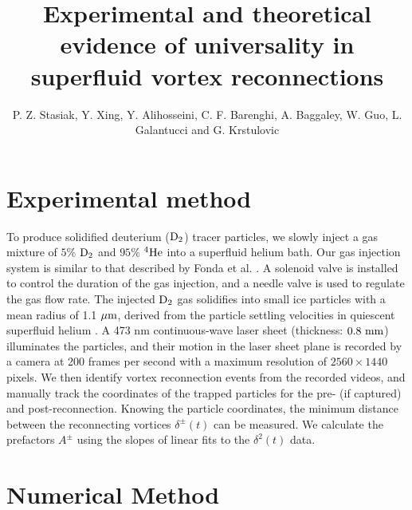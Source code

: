 \documentclass[9pt,twoside]{pnas-new}
\title{Experimental and theoretical evidence of universality in superfluid vortex reconnections}
\author{P. Z. Stasiak, Y. Xing, Y. Alihosseini, C. F. Barenghi, A. Baggaley, W. Guo, L. Galantucci and G. Krstulovic}
\begin{document}

\maketitle

\SItext%
\section*{Experimental method}

To produce solidified deuterium ($\rm D_2$) tracer particles, we slowly inject a gas mixture of $5\%$ $\rm D_2$ and $95\%$ ${}^{4}\rm He$ into a superfluid helium bath. Our gas injection system is similar to that described by Fonda et al. \cite{fonda2016injection}. A solenoid valve is installed to control the duration of the gas injection, and a needle valve is used to regulate the gas flow rate. The injected $\rm D_2$ gas solidifies into small ice particles with a mean radius of 1.1 $\mu \rm m$, derived from the particle settling velocities in quiescent superfluid helium \cite{tang2023visualization}. A 473 nm continuous-wave laser sheet (thickness: $0.8~\rm mm$) illuminates the particles, and their motion in the laser sheet plane is recorded by a camera at 200 frames per second with a maximum resolution of $2560 \times 1440$ pixels. We then identify vortex reconnection events from the recorded videos, and manually track the coordinates of the trapped particles for the pre- (if captured) and post-reconnection. Knowing the particle coordinates, the minimum distance between the reconnecting vortices $\delta^{\pm}(t)$ can be measured. We calculate the prefactors $A^\pm$ using the slopes of linear fits to the $\delta^2(t)$ data.

\section*{Numerical Method}
\end{document}
